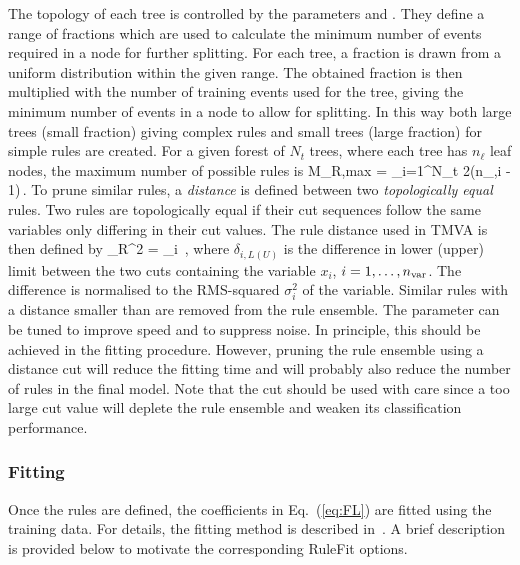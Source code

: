 The topology of each tree is controlled by the
parameters  and .
They define a range of fractions which are
used to calculate the minimum number of events required in a node for
further splitting. For each tree, a fraction is drawn from a uniform
distribution within the given range. The obtained fraction is then
multiplied with the number of training events used for the tree,
giving the minimum number of events in a node to allow for splitting.
In this way both large trees (small fraction) giving complex rules and
small trees (large fraction) for simple rules are created.  For a
given forest of $N_t$ trees, where each tree has $n_\ell$ leaf nodes,
the maximum number of possible rules is
\beq
   M_{R,\rm max} = \sum_{i=1}^{N_t} 2(n_{\ell,i} - 1)\,.
\eeq
To prune similar rules, a {\em distance} is defined between two
{\em topologically equal} rules. Two rules are topologically equal if 
their cut sequences follow the same variables only differing in their cut values.
The rule distance used in TMVA is then defined by
\beq
   \delta_R^2 = \sum_{i} \,,
\label{eq:ruleDist}
\eeq
where $\delta_{i,L(U)}$ is the difference in lower (upper) limit between
the two cuts containing the variable $x_i$, $i=1,\dots,{n_\text{var}}$. The difference is 
normalised to the RMS-squared $\sigma_i^2$ of the variable.  Similar rules with 
a distance smaller than  are removed from the rule
ensemble. The parameter can be tuned to improve speed and to suppress
noise. In principle, this should be achieved in the fitting procedure. However,
pruning the rule ensemble using a distance cut will reduce the fitting time and 
will probably also reduce the number of rules in the final model.
Note that the cut should be used with care since a too large
cut value will deplete the rule ensemble and weaken its classification
performance.

\subsubsection*{Fitting}
\label{sec:rulefitting}

Once the rules are defined, the coefficients in Eq.~(\ref{eq:FL}) are fitted using
the training data. For details, the fitting method is described in~\cite{RuleFitMin}. 
A brief description is provided below to motivate the corresponding RuleFit options.

